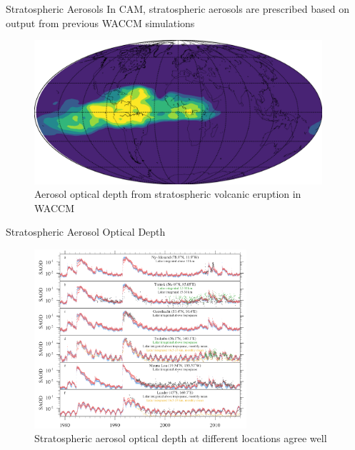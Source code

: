 \documentclass[xcolor=dvipsnames]{beamer} %
\begin{document}
\begin{frame}{Stratospheric Aerosols}
	In CAM, stratospheric aerosols are prescribed based on output from previous WACCM
	simulations
	\begin{figure}
		\begin{center}
			\includegraphics[width=0.95\textwidth]{./assets/frame_00009-2.png}
		\end{center}
		\caption*{\scriptsize Aerosol optical depth from stratospheric volcanic eruption in WACCM}
		\label{fig:so2-distribution}
	\end{figure}
\end{frame}

\begin{frame}{Stratospheric Aerosol Optical Depth}
	\begin{figure}
		\begin{center}
			\includegraphics[width=0.70\textwidth]{./assets/saod-2.png}
		\end{center}
		\caption*{\scriptsize Stratospheric aerosol optical depth at different locations agree well}
		\label{fig:saod}
	\end{figure}
    \vspace{-9mm}
\end{frame}
\end{document}
